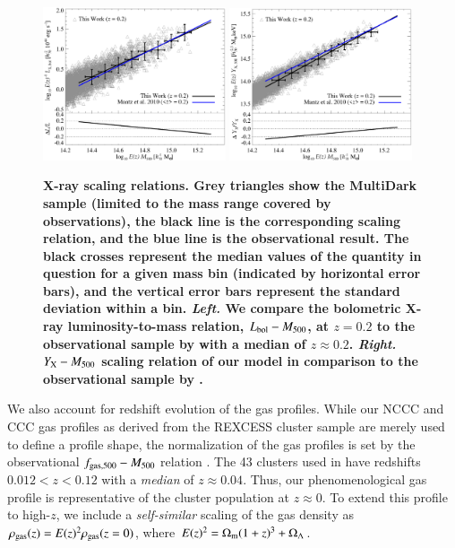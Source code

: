 \documentclass[useAMS,usenatbib]{mn2e}
\begin{document}
\begin{figure} 
\centering
\includegraphics[width=0.48\textwidth]{figures/lx_m.eps}
\includegraphics[width=0.48\textwidth]{figures/yx_m.eps}
\caption{{\bf X-ray scaling relations. Grey triangles show the MultiDark
  sample (limited to the mass range covered by observations), the black line is
  the corresponding scaling relation, and the blue line is the
  observational result. The black crosses represent the median values of the
  quantity in question for a given mass bin (indicated by horizontal error
  bars), and the vertical error bars represent the standard deviation within a
  bin.  \emph{Left.} We compare the bolometric X-ray luminosity-to-mass
  relation, $L_{{\mathrm{bol}}}-M_{500}$, at $z=0.2$ to the observational sample by
  \protect\cite{2010MNRAS.406.1773M} with a median of $z \approx 0.2$. 
  \emph{Right.} $Y_{{\mathrm{X}}}-M_{500}$ scaling relation of our model in comparison to the
  observational sample by \protect\cite{2010MNRAS.406.1773M}.}} 
\label{fig:X_LM}
\end{figure}

We also account for redshift evolution of the gas profiles. While our NCCC and
CCC gas profiles as derived from the REXCESS cluster sample are merely used to
define a profile shape, the normalization of the gas profiles is set by the
observational $f_{{\mathrm{gas}},500}-M_{500}$ relation \citep{2009ApJ...693.1142S}.
The 43 clusters used in \cite{2009ApJ...693.1142S} have redshifts $0.012 < z <
0.12$ with a \emph{median} of $z \approx 0.04$. Thus, our phenomenological gas
profile is representative of the cluster population at $z\approx0$. To extend this
profile to high-$z$, we include a \emph{self-similar} scaling of the gas density
as $\rho_{{\mathrm{gas}}}(z) = E(z)^{2} \rho_{{\mathrm{gas}}}(z=0)$, where $E(z)^{2} =
\Omega_{{\mathrm{m}}} (1+z)^{3} + \Omega_{{\Lambda}}$.
\end{document}
